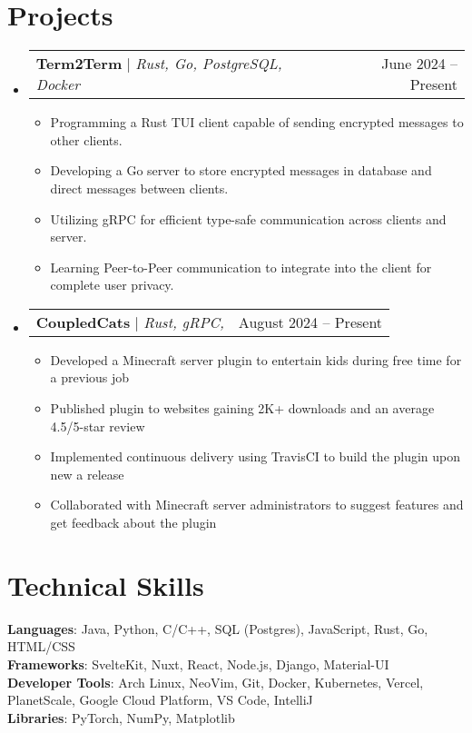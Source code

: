 \documentclass[letterpaper,11pt]{article}
\makeatletter
\newcommand{\resumeItem}[1]{
  \item\small{
    {#1 \vspace{-2pt}}
  }
}
\newcommand{\resumeProjectHeading}[2]{
    \item
    \begin{tabular*}{0.97\textwidth}{l@{\extracolsep{\fill}}r}
      \small#1 & #2 \\
    \end{tabular*}\vspace{-7pt}
}
\newcommand{\resumeSubHeadingListStart}{\begin{itemize}[leftmargin=0.15in, label={}]}
\newcommand{\resumeSubHeadingListEnd}{\end{itemize}}
\newcommand{\resumeItemListStart}{\begin{itemize}}
\newcommand{\resumeItemListEnd}{\end{itemize}\vspace{-5pt}}
\makeatother
\begin{document}
\section{Projects}
    \resumeSubHeadingListStart
      \resumeProjectHeading
          {\textbf{Term2Term} $|$ \emph{Rust, Go, PostgreSQL, Docker}}{June 2024 -- Present}
          \resumeItemListStart
            \resumeItem{Programming a Rust TUI client capable of sending encrypted messages to other clients.}
            \resumeItem{Developing a Go server to store encrypted messages in database and direct messages between clients.}
            \resumeItem{Utilizing gRPC for efficient type-safe communication across clients and server.}
            \resumeItem{Learning Peer-to-Peer communication to integrate into the client for complete user privacy.}
          \resumeItemListEnd
      \resumeProjectHeading
          {\textbf{CoupledCats} $|$ \emph{Rust, gRPC, }}{August 2024 -- Present}
          \resumeItemListStart
            \resumeItem{Developed a Minecraft server plugin to entertain kids during free time for a previous job}
            \resumeItem{Published plugin to websites gaining 2K+ downloads and an average 4.5/5-star review}
            \resumeItem{Implemented continuous delivery using TravisCI to build the plugin upon new a release}
            \resumeItem{Collaborated with Minecraft server administrators to suggest features and get feedback about the plugin}
          \resumeItemListEnd
    \resumeSubHeadingListEnd



%
\section{Technical Skills}
 \begin{itemize}[leftmargin=0.15in, label={}]
    \small{\item{
     \textbf{Languages}{: Java, Python, C/C++, SQL (Postgres), JavaScript, Rust, Go, HTML/CSS} \\
     \textbf{Frameworks}{: SvelteKit, Nuxt, React, Node.js, Django, Material-UI} \\
     \textbf{Developer Tools}{: Arch Linux, NeoVim, Git, Docker, Kubernetes, Vercel, PlanetScale, Google Cloud Platform, VS Code, IntelliJ} \\
     \textbf{Libraries}{: PyTorch, NumPy, Matplotlib}
    }}
 \end{itemize}


\end{document}
